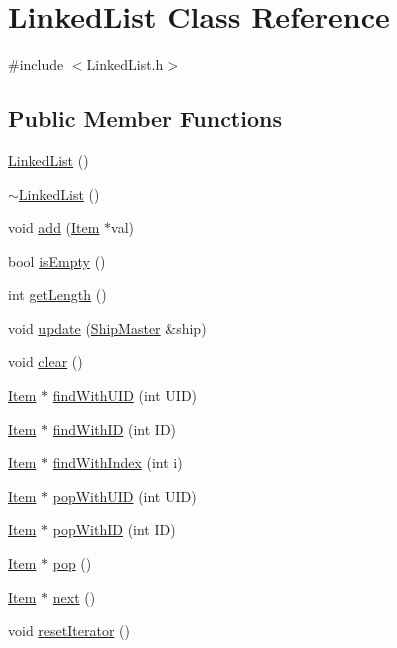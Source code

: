 \hypertarget{classLinkedList}{\section{Linked\-List Class Reference}
\label{classLinkedList}
}


{\ttfamily \#include $<$Linked\-List.\-h$>$}

\subsection*{Public Member Functions}
\begin{DoxyCompactItemize}
\item 
\hyperlink{classLinkedList_afe7f78983e173f8018927cf2ad11a5aa}{Linked\-List} ()
\item 
\hyperlink{classLinkedList_a35811ed58ff0d8d9cc9b309b8d8f5111}{$\sim$\-Linked\-List} ()
\item 
void \hyperlink{classLinkedList_a78172a81bf60fbbd33e65305826d028b}{add} (\hyperlink{classItem}{Item} $\ast$val)
\item 
bool \hyperlink{classLinkedList_a03ff22f881325da2d37f640ab2380bf2}{is\-Empty} ()
\item 
int \hyperlink{classLinkedList_a92bb5271734b51ab089d75bf52aee919}{get\-Length} ()
\item 
void \hyperlink{classLinkedList_ae973d79346684a26166c539896d2d1b7}{update} (\hyperlink{classShipMaster}{Ship\-Master} \&ship)
\item 
void \hyperlink{classLinkedList_a261977565e78dd74f288d47ba5865242}{clear} ()
\item 
\hyperlink{classItem}{Item} $\ast$ \hyperlink{classLinkedList_a52c070ab08f67e26ec260412024fb20e}{find\-With\-U\-I\-D} (int U\-I\-D)
\item 
\hyperlink{classItem}{Item} $\ast$ \hyperlink{classLinkedList_ae051024e7e6ba32002ba0f40a7843f0d}{find\-With\-I\-D} (int I\-D)
\item 
\hyperlink{classItem}{Item} $\ast$ \hyperlink{classLinkedList_ab7bc50ad1c97b0559d00e5a6e2da78cd}{find\-With\-Index} (int i)
\item 
\hyperlink{classItem}{Item} $\ast$ \hyperlink{classLinkedList_abfe92bb8d0e4ab6072a09a74a515111e}{pop\-With\-U\-I\-D} (int U\-I\-D)
\item 
\hyperlink{classItem}{Item} $\ast$ \hyperlink{classLinkedList_a181a5fd6df446be45690966536aaf3c6}{pop\-With\-I\-D} (int I\-D)
\item 
\hyperlink{classItem}{Item} $\ast$ \hyperlink{classLinkedList_a30b300a0ad095ac7c19717cb3894ddb2}{pop} ()
\item 
\hyperlink{classItem}{Item} $\ast$ \hyperlink{classLinkedList_a7106d9f9335485f9f4bc6945d25d9804}{next} ()
\item 
void \hyperlink{classLinkedList_aa97c4254d7eacee2b33ce306c3162b61}{reset\-Iterator} ()
\end{DoxyCompactItemize}


